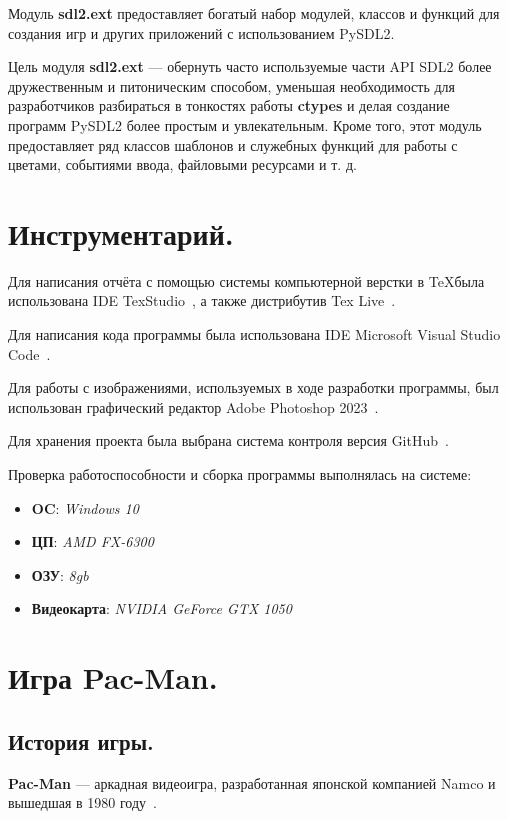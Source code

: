 Модуль \textbf{sdl2.ext} предоставляет богатый набор модулей, классов и функций для создания игр и других приложений с использованием PySDL2.

Цель модуля \textbf{sdl2.ext} --- обернуть часто используемые части API SDL2 более дружественным и питоническим способом, уменьшая необходимость для разработчиков разбираться в тонкостях работы \textbf{ctypes} и делая создание программ PySDL2 более простым и увлекательным.
Кроме того, этот модуль предоставляет ряд классов шаблонов и служебных функций для работы с цветами, событиями ввода, файловыми ресурсами и т. д.


\section{\label{sec:ch01/sec03}Инструментарий.}
Для написания отчёта с помощью системы компьютерной верстки в \TeX была использована IDE TexStudio~\cite{texRUtexstud,texENtexstud}, а также дистрибутив Tex Live~\cite{texRUtexlive}.

Для написания кода программы была использована IDE Microsoft Visual Studio Code~\cite{vscodeEN}.

Для работы с изображениями, используемых в ходе разработки программы, был использован графический редактор Adobe Photoshop 2023~\cite{adobeRU}.

Для хранения проекта была выбрана система контроля версия GitHub~\cite{wikiRUGitHub}.

Проверка работоспособности и сборка программы выполнялась на системе:
	\begin{itemize}
		\item \textbf{OC}: \textit{Windows 10}
		\item \textbf{ЦП}: \textit{AMD FX-6300}
		\item \textbf{ОЗУ}: \textit{8gb}
		\item \textbf{Видеокарта}: \textit{NVIDIA GeForce GTX 1050}
	\end{itemize}
	

\section{\label{sec:ch01/sec04}Игра Pac-Man.}
\subsection{\label{subsec:ch01/sec04/subsec01}История игры.}
\textbf{Pac-Man} --- аркадная видеоигра, разработанная японской компанией Namco и вышедшая в 1980 году~\cite{pacmanRU}.

